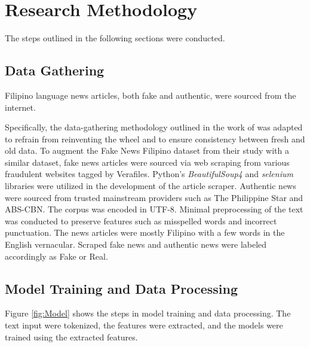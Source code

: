 \chapter{Research Methodology}

The steps outlined in the following sections were conducted.

\section{Data Gathering}

Filipino language news articles, both fake and authentic, were sourced from the internet.

Specifically, the data-gathering methodology outlined in the work of \cite{cruz2020localization} was adapted to refrain from reinventing the wheel and to ensure consistency between fresh and old data. To augment the Fake News Filipino dataset from their study with a similar dataset, fake news articles were sourced via web scraping from various fraudulent websites tagged by Verafiles. Python's \textit{BeautifulSoup4} and \textit{selenium} libraries were utilized in the development of the article scraper. Authentic news were sourced from trusted mainstream providers such as The Philippine Star and ABS-CBN. The corpus was encoded in UTF-8. Minimal preprocessing of the text was conducted to preserve features such as misspelled words and incorrect punctuation. The news articles were mostly Filipino with a few words in the English vernacular. Scraped fake news and authentic news were labeled accordingly as Fake or Real.

\section{Model Training and Data Processing}
\label{sec:ModelTraining}

Figure \ref{fig:Model} shows the steps in model training and data processing. The text input were tokenized, the features were extracted, and the models were trained using the extracted features.

